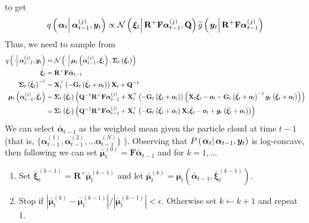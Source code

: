 \documentclass[notitlepage]{article}
\renewcommand{\vec}[1]{\bm{#1}}
\newcommand{\vecb}[1]{\bar{\vec{#1}}}
\newcommand{\mat}[1]{\mathbf{#1}}
\newcommand{\Lparen}[1]{\left( #1\right)}
\newcommand{\Lvert}[1]{\left\vert #1\right\vert}
\newcommand{\Cond}[2]{\left. #1 \vphantom{#2} \right\vert  #2}
\newcommand{\optor}[2]{#1\Lparen{#2}}
\newcommand{\optorC}[3]{\optor{#1}{\Cond{#2}{#3}}}
\newcommand{\normalC}[3]{\optorC{\mathcal{N}}{#1}{#2,#3}}
\newcommand{\IDC}[2]{\optorC{q}{#1}{#2}}
\newcommand{\partic}[3]{#1_{#2}^{\Lparen{#3}}}
\newcommand{\nPart}{N}
\begin{document}
%
%
to get%
%
\begin{equation}
	\IDC{\vec{\alpha}_t}{\partic{\vec{\alpha}}{t-1}{j}, \vec{y}_t} \propto %
		\normalC{\vec{\xi}_t}{\mat{R}^{+}\mat{F}\partic{\vec{\alpha}}{t-1}{j}}{\mat{Q}}
		\optorC{\widetilde{g}}{\vec{y}_t}{\mat{R}^{+}\mat{F}\partic{\vec{\alpha}}{t-1}{j}}
\end{equation}
%
%
Thus, we need to sample from%
%
{\scriptsize %
\begin{equation}\label{eqn:TaylorProposalForward}\begin{split}
	\IDC{\cdot}{\partic{\vec{\alpha}}{t-1}{j}, \vec{y}_t} &=  %
		\normalC{\cdot}{
			\vec{\mu}_t\Lparen{\partic{\vec{\alpha}}{t-1}{j}, \vecb{\xi}_t}
		}{
			\mat{\Sigma}_t\Lparen{\vecb{\xi}_t}
		} \\
%
	\vecb{\xi}_t &= \mat{R}^{+}\mat{F}\vecb{\alpha}_{t - 1} \\
%
	\mat{\Sigma}_t\Lparen{\vecb{\xi}_t}^{-1} &= \mat{X}_t^\top
		\Lparen{-\mat{G}_t\Lparen{\vecb{\xi}_t + \vec{o}_t}}
		\mat{X}_t + \mat{Q}^{-1}  \\
%
	\vec{\mu}_t\Lparen{\partic{\vec{\alpha}}{t-1}{j}, \vecb{\xi}_t} 
	&= \mat{\Sigma}_t\Lparen{\vecb{\xi}_t}\Lparen{
		\mat{Q}^{-1}\mat{R}^{+}\mat{F}\partic{\vec{\alpha}}{t-1}{j} +
		\mat{X}_t^\top \Lparen{-\mat{G}_t\Lparen{\vecb{\xi}_t + \vec{o}_t}}
		\Lparen{
			\mat{X}_t\vecb{\xi}_t - \vec{o}_t -
			\mat{G}_t\Lparen{\vecb{\xi}_t + \vec{o}_t}^{-1}
			\vec{g}_t\Lparen{\vecb{\xi}_t + \vec{o}_t}
		}
	} \\
%
	 &= \mat{\Sigma}_t\Lparen{\vecb{\xi}_t}\Lparen{
		\mat{Q}^{-1}\mat{R}^{+}\mat{F}\partic{\vec{\alpha}}{t-1}{j} +
		\mat{X}_t^\top
		\Lparen{
			-\mat{G}_t\Lparen{\vecb{\xi}_t + \vec{o}_t}
			\mat{X}_t\vecb{\xi}_t - \vec{o}_t +
			\vec{g}_t\Lparen{\vecb{\xi}_t + \vec{o}_t}
		}
	}
\end{split}\end{equation}
}%
%
%
We can select  $\vecb{\alpha}_{t - 1}$ as the weighted mean given the particle cloud at time $t-1$ (that is, %
$\{\partic{\vec{\alpha}}{t-1}{1}, \partic{\vec{\alpha}}{t-1}{2}, \dots \partic{\vec{\alpha}}{t-1}{\nPart}\}$%
). Observing that $\optorC{P}{\vec{\alpha}_t}{\vec{\alpha}_{t - 1}, \vec{y}_t}$ is log-concave, then following \cite{doucet00} we can set $\vecb{\mu}_t^{(0)} = \mat{F}\vecb{\alpha}_{t - 1}$ and for $k = 1, \dots$ %
%
\begin{enumerate}
  \item Set $\vecb{\xi}_t^{(k - 1)} = \mat{R}^+ \vecb{\mu}_t^{(k - 1)}$ and let $\vecb{\mu}_t^{(k)} = \vec{\mu}_t\Lparen{\vecb{\alpha}_{t - 1}, \vecb{\xi}_t^{(k-1)}}$.
  \item Stop if $\Lvert{\vecb{\mu}_t^{(k)} - \vecb{\mu}_t^{(k - 1)}} / \Lvert{\vecb{\mu}_t^{(k - 1)}} < \epsilon$. Otherwise set $k \leftarrow k + 1$ and repeat 1. 
\end{enumerate}%
\end{document}
